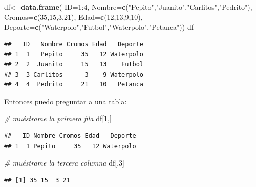 \documentclass[]{book}
\newenvironment{Shaded}{\begin{snugshade}}{\end{snugshade}}
\newcommand{\KeywordTok}[1]{\textcolor[rgb]{0.13,0.29,0.53}{\textbf{{#1}}}}
\newcommand{\DataTypeTok}[1]{\textcolor[rgb]{0.13,0.29,0.53}{{#1}}}
\newcommand{\DecValTok}[1]{\textcolor[rgb]{0.00,0.00,0.81}{{#1}}}
\newcommand{\StringTok}[1]{\textcolor[rgb]{0.31,0.60,0.02}{{#1}}}
\newcommand{\CommentTok}[1]{\textcolor[rgb]{0.56,0.35,0.01}{\textit{{#1}}}}
\newcommand{\NormalTok}[1]{{#1}}
\theoremstyle{definition}
\theoremstyle{definition}
\theoremstyle{remark}
\begin{document}
\begin{Shaded}
\begin{Highlighting}[]
\NormalTok{df<-}\StringTok{ }\KeywordTok{data.frame}\NormalTok{( }\DataTypeTok{ID=}\DecValTok{1}\NormalTok{:}\DecValTok{4}\NormalTok{,}
     \DataTypeTok{Nombre=}\KeywordTok{c}\NormalTok{(}\StringTok{"Pepito"}\NormalTok{,}\StringTok{"Juanito"}\NormalTok{,}\StringTok{"Carlitos"}\NormalTok{,}\StringTok{"Pedrito"}\NormalTok{),}
     \DataTypeTok{Cromos=}\KeywordTok{c}\NormalTok{(}\DecValTok{35}\NormalTok{,}\DecValTok{15}\NormalTok{,}\DecValTok{3}\NormalTok{,}\DecValTok{21}\NormalTok{), }
     \DataTypeTok{Edad=}\KeywordTok{c}\NormalTok{(}\DecValTok{12}\NormalTok{,}\DecValTok{13}\NormalTok{,}\DecValTok{9}\NormalTok{,}\DecValTok{10}\NormalTok{),}
     \DataTypeTok{Deporte=}\KeywordTok{c}\NormalTok{(}\StringTok{"Waterpolo"}\NormalTok{,}\StringTok{"Futbol"}\NormalTok{,}\StringTok{"Waterpolo"}\NormalTok{,}\StringTok{"Petanca"}\NormalTok{))     }
\NormalTok{df}
\end{Highlighting}
\end{Shaded}

\begin{verbatim}
##   ID   Nombre Cromos Edad   Deporte
## 1  1   Pepito     35   12 Waterpolo
## 2  2  Juanito     15   13    Futbol
## 3  3 Carlitos      3    9 Waterpolo
## 4  4  Pedrito     21   10   Petanca
\end{verbatim}

Entonces puedo preguntar a una tabla:

\begin{Shaded}
\begin{Highlighting}[]
\CommentTok{# muéstrame la primera fila}
\NormalTok{df[}\DecValTok{1}\NormalTok{,] }
\end{Highlighting}
\end{Shaded}

\begin{verbatim}
##   ID Nombre Cromos Edad   Deporte
## 1  1 Pepito     35   12 Waterpolo
\end{verbatim}

\begin{Shaded}
\begin{Highlighting}[]
\CommentTok{# muéstrame la tercera columna}
\NormalTok{df[,}\DecValTok{3}\NormalTok{] }
\end{Highlighting}
\end{Shaded}

\begin{verbatim}
## [1] 35 15  3 21
\end{verbatim}
\end{document}
